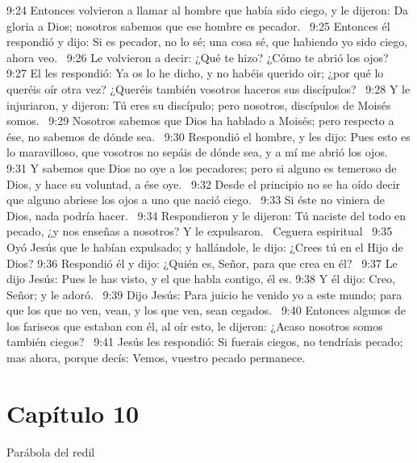 9:24 Entonces volvieron a llamar al hombre que había sido ciego, y le dijeron: Da gloria a Dios; nosotros sabemos que ese hombre es pecador.  
9:25 Entonces él respondió y dijo: Si es pecador, no lo sé; una cosa sé, que habiendo yo sido ciego, ahora veo.  
9:26 Le volvieron a decir: ¿Qué te hizo? ¿Cómo te abrió los ojos?  
9:27 El les respondió: Ya os lo he dicho, y no habéis querido oir; ¿por qué lo queréis oír otra vez? ¿Queréis también vosotros haceros sus discípulos?  
9:28 Y le injuriaron, y dijeron: Tú eres su discípulo; pero nosotros, discípulos de Moisés somos.  
9:29 Nosotros sabemos que Dios ha hablado a Moisés; pero respecto a ése, no sabemos de dónde sea.  
9:30 Respondió el hombre, y les dijo: Pues esto es lo maravilloso, que vosotros no sepáis de dónde sea, y a mí me abrió los ojos.  
9:31 Y sabemos que Dios no oye a los pecadores; pero si alguno es temeroso de Dios, y hace su voluntad, a ése oye.  
9:32 Desde el principio no se ha oído decir que alguno abriese los ojos a uno que nació ciego.  
9:33 Si éste no viniera de Dios, nada podría hacer.  
9:34 Respondieron y le dijeron: Tú naciste del todo en pecado, ¿y nos enseñas a nosotros? Y le expulsaron.  
Ceguera espiritual  
9:35 Oyó Jesús que le habían expulsado; y hallándole, le dijo: ¿Crees tú en el Hijo de Dios? 
9:36 Respondió él y dijo: ¿Quién es, Señor, para que crea en él?  
9:37 Le dijo Jesús: Pues le has visto, y el que habla contigo, él es. 
9:38 Y él dijo: Creo, Señor; y le adoró.  
9:39 Dijo Jesús: Para juicio he venido yo a este mundo; para que los que no ven, vean, y los que ven, sean cegados.  
9:40 Entonces algunos de los fariseos que estaban con él, al oír esto, le dijeron: ¿Acaso nosotros somos también ciegos?  
9:41 Jesús les respondió: Si fuerais ciegos, no tendríais pecado; mas ahora, porque decís: Vemos, vuestro pecado permanece.  
\section*{Capítulo 10}
Parábola del redil  

